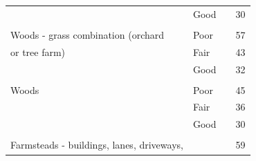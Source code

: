 \documentclass{article}
\begin{document}
\begin{center}
\begin{tabular}{|l|lll|}
                                              & Good                 &  & 30                                                          \\ 

                                              &                      &  &                                                            \\ 

    Woods - grass combination (orchard        & Poor                 &  & 57                                                        \\ 

    or tree farm)                        & Fair                 &  & 43                                                      \\ 

                                              & Good                 &  & 32                                                  \\ 

                                              &                      &  &                                                \\ 

    Woods                                  & Poor                 &  & 45                                                    \\ 

                                              & Fair                 &  & 36                                                        \\ 

                                              & Good                 &  & 30                                                \\ 

                                              &                      &  &                                                          \\ 

    Farmsteads - buildings, lanes, driveways, &                      &  & 59                                                  \\ 


\end{tabular}
\end{center}
\end{document}
